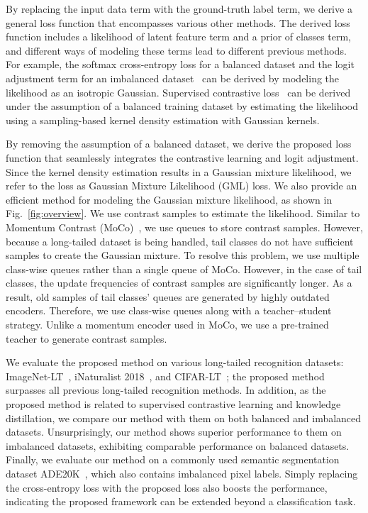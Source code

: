 \documentclass{article}
\theoremstyle{plain}
\theoremstyle{definition}
\theoremstyle{remark}
\begin{document}
By replacing the input data term with the ground-truth label term, we derive a general loss function that encompasses various other methods. The derived loss function includes a likelihood of latent feature term and a prior of classes term, and different ways of modeling these terms lead to different previous methods. For example, the softmax cross-entropy loss for a balanced dataset and the logit adjustment term for an imbalanced dataset~\cite{ren2020balanced} can be derived by modeling the likelihood as an isotropic Gaussian. Supervised contrastive loss~\cite{khosla2020supervised} can be derived under the assumption of a balanced training dataset by estimating the likelihood using a sampling-based kernel density estimation with Gaussian kernels.

By removing the assumption of a balanced dataset, we derive the proposed loss function that seamlessly integrates the contrastive learning and logit adjustment. Since the kernel density estimation results in a Gaussian mixture likelihood, we refer to the loss as Gaussian Mixture Likelihood (GML) loss. We also provide an efficient method for modeling the Gaussian mixture likelihood, as shown in Fig.~\ref{fig:overview}. We use contrast samples to estimate the likelihood. Similar to Momentum Contrast (MoCo)~\cite{he2020momentum}, we use queues to store contrast samples. However, because a long-tailed dataset is being handled, tail classes do not have sufficient samples to create the Gaussian mixture. To resolve this problem, we use multiple class-wise queues rather than a single queue of MoCo. However, in the case of tail classes, the update frequencies of contrast samples are significantly longer. As a result, old samples of tail classes' queues are generated by highly outdated encoders. Therefore, we use class-wise queues along with a teacher--student strategy. Unlike a momentum encoder used in MoCo, we use a pre-trained teacher to generate contrast samples.

We evaluate the proposed method on various long-tailed recognition datasets: ImageNet-LT~\cite{liu2019large}, iNaturalist 2018~\cite{van2018inaturalist}, and CIFAR-LT~\cite{cui2019class}; the proposed method surpasses all previous long-tailed recognition methods. In addition, as the proposed method is related to supervised contrastive learning and knowledge distillation, we compare our method with them on both balanced and imbalanced datasets. Unsurprisingly, our method shows superior performance to them on imbalanced datasets, exhibiting comparable performance on balanced datasets. Finally, we evaluate our method on a commonly used semantic segmentation dataset ADE20K~\cite{zhou2017scene}, which also contains imbalanced pixel labels. Simply replacing the cross-entropy loss with the proposed loss also boosts the performance, indicating the proposed framework can be extended beyond a classification task.
\end{document}
